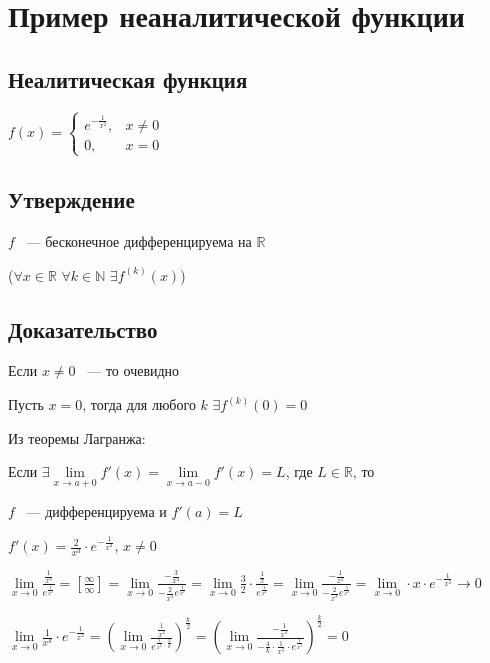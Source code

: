 \documentclass{article}
\begin{document}
	\newpage
	
	\section{Пример неаналитической функции}
	
		\subsection{Неалитическая функция}
		
			$f(x) = \begin{cases} e^{-\frac{1}{x^2}}, & x \neq 0 \\ 0, & x = 0 \end{cases}$
			
		\subsection{Утверждение}
		
			$f$ ~--- бесконечное дифференцируема на $\mathbb{R}$
			
			($\forall x \in \mathbb{R}$ $\forall k \in \mathbb{N}$ $\exists f^{(k)} (x)$)
			
		\subsection{Доказательство}
		
			Если $x \neq 0$ ~--- то очевидно
			
			Пусть $x = 0$, тогда для любого $k$ $\exists f^{(k)} (0) = 0$
			
			Из теоремы Лагранжа:
			
			Если $\exists \lim\limits_{x \rightarrow a + 0} f'(x) = \lim\limits_{x \rightarrow a - 0} f'(x) = L$, где $L \in \mathbb{R}$, то
			
			$f$ ~--- дифференцируема и $f'(a) = L$
			
			$f'(x) = \frac{2}{x^3} \cdot e^{-\frac{1}{x^2}}$, $x \neq 0$
			
			$\lim\limits_{x \rightarrow 0} \frac{\frac{1}{x^3}}{e^{\frac{1}{x^2}}} = \left[ \frac{\infty}{\infty} \right] = \lim\limits_{x \rightarrow 0} \frac{-\frac{3}{x^4}}{-\frac{2}{x^3} e^{\frac{1}{x^2}}} = \lim\limits_{x \rightarrow 0} \frac{3}{2} \cdot \frac{\frac{1}{x}}{e^{\frac{1}{x^2}}} = \lim\limits_{x \rightarrow 0} \frac{-\frac{1}{x^2}}{-\frac{2}{x^3} e^{\frac{1}{x^2}}} = \lim\limits_{x \rightarrow 0} \cdot x \cdot e^{-\frac{1}{x^2}} \rightarrow 0$
			
			$\lim\limits_{x \rightarrow 0} \frac{1}{x^k} \cdot e^{-\frac{1}{x^2}} = \left( \lim\limits_{x \rightarrow 0} \frac{\frac{1}{x^2}}{e^{\frac{1}{x^2} \cdot \frac{2}{k}}} \right)^{\frac{k}{2}} = \left( \lim\limits_{x \rightarrow 0} \frac{-\frac{1}{x^3}}{-\frac{4}{k} \cdot \frac{1}{x^3} \cdot e^{\frac{1}{x^3}}} \right)^\frac{k}{2} = 0$
			
\end{document}
